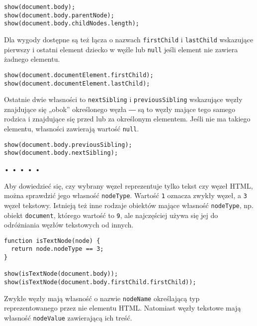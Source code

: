   
\begin{verbatim} 
show(document.body);
show(document.body.parentNode);
show(document.body.childNodes.length);
 \end{verbatim}
  
Dla wygody dostępne są też łącza o nazwach \texttt{firstChild} i \texttt{lastChild} wskazujące pierwszy i ostatni element dziecko w węźle lub \texttt{null} jeśli element nie zawiera żadnego elementu.

  
\begin{verbatim} 
show(document.documentElement.firstChild);
show(document.documentElement.lastChild);
 \end{verbatim}
  
Ostatnie dwie własności to \texttt{nextSibling} i \texttt{previousSibling} wskazujące węzły znajdujące się „obok” określonego węzła ― są to węzły mające tego samego rodzica i znajdujące się przed lub za określonym elementem. Jeśli nie ma takiego elementu, własności zawierają wartość \texttt{null}.

  
\begin{verbatim} 
show(document.body.previousSibling);
show(document.body.nextSibling);
 \end{verbatim}


\begin{center}
• • • • •
\end{center}

  
Aby dowiedzieć się, czy wybrany węzeł reprezentuje tylko tekst czy węzeł HTML, można sprawdzić jego własność \texttt{nodeType}. Wartość \texttt{1} oznacza zwykły węzeł, a \texttt{3} węzeł tekstowy. Istnieją też inne rodzaje obiektów mające własność \texttt{nodeType}, np. obiekt \texttt{document}, którego wartość to \texttt{9}, ale najczęściej używa się jej do odróżniania węzłów tekstowych od innych.

  
\begin{verbatim} 
function isTextNode(node) {
  return node.nodeType == 3;
}

show(isTextNode(document.body));
show(isTextNode(document.body.firstChild.firstChild));
 \end{verbatim}
  
Zwykłe węzły mają własność o nazwie \texttt{nodeName} określającą typ reprezentowanego przez nie elementu HTML. Natomiast węzły tekstowe mają własność \texttt{nodeValue} zawierającą ich treść.

